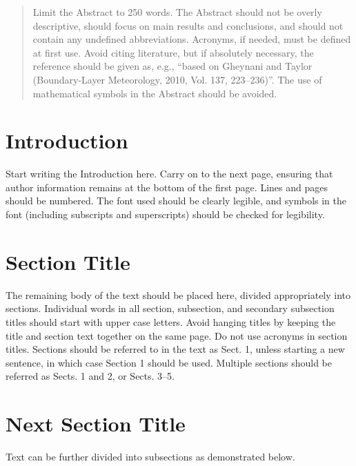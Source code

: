 \begin{abstract}Limit the Abstract to 250 words. The Abstract should not be overly descriptive, should focus on main results and conclusions, and should not contain any undefined abbreviations. Acronyms, if needed, must be defined at first use. Avoid citing literature, but if absolutely necessary, the reference should be given as, e.g., ``based on Gheynani and Taylor (Boundary-Layer Meteorology, 2010, Vol. 137, 223--236)''. The use of mathematical symbols in the Abstract should be avoided.
\end{abstract}

\section{Introduction}
\label{intro}
Start writing the Introduction here. Carry on to the next page, ensuring that author information remains at the bottom of the first page. Lines and pages should be numbered. The font used should be clearly legible, and symbols in the font (including subscripts and superscripts) should be checked for legibility.


\section{Section Title}
\label{sec:1}
The remaining body of the text should be placed here, divided appropriately into sections. Individual words in all section, subsection, and secondary subsection titles should start with upper case letters. Avoid hanging titles by keeping the title and section text together on the same page. Do not use acronyms in section titles. Sections should be referred to in the text as Sect. 1, unless starting a new sentence, in which case Section 1 should be used. Multiple sections should be referred as Sects. 1 and 2, or Sects. 3–5.

\section{Next Section Title}
Text can be further divided into subsections as demonstrated below.

